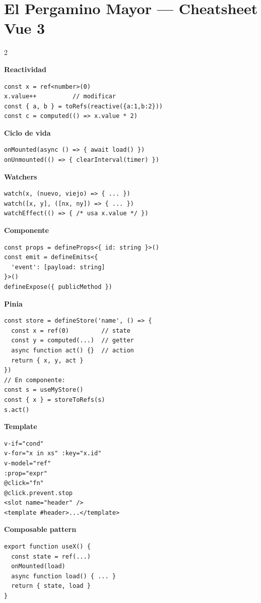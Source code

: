 \documentclass[11pt,a4paper]{article}
\begin{document}
\newpage
\section{El Pergamino Mayor — Cheatsheet Vue 3}

\begin{multicols}{2}

\textbf{\textcolor{vuegreen}{Reactividad}}
\begin{lstlisting}[style=vue,numbers=none]
const x = ref<number>(0)
x.value++          // modificar
const { a, b } = toRefs(reactive({a:1,b:2}))
const c = computed(() => x.value * 2)
\end{lstlisting}

\textbf{\textcolor{vuegreen}{Ciclo de vida}}
\begin{lstlisting}[style=vue,numbers=none]
onMounted(async () => { await load() })
onUnmounted(() => { clearInterval(timer) })
\end{lstlisting}

\textbf{\textcolor{vuegreen}{Watchers}}
\begin{lstlisting}[style=vue,numbers=none]
watch(x, (nuevo, viejo) => { ... })
watch([x, y], ([nx, ny]) => { ... })
watchEffect(() => { /* usa x.value */ })
\end{lstlisting}

\textbf{\textcolor{vuegreen}{Componente}}
\begin{lstlisting}[style=vue,numbers=none]
const props = defineProps<{ id: string }>()
const emit = defineEmits<{
  'event': [payload: string]
}>()
defineExpose({ publicMethod })
\end{lstlisting}

\columnbreak

\textbf{\textcolor{golddnd}{Pinia}}
\begin{lstlisting}[style=vue,numbers=none]
const store = defineStore('name', () => {
  const x = ref(0)         // state
  const y = computed(...)  // getter
  async function act() {}  // action
  return { x, y, act }
})
// En componente:
const s = useMyStore()
const { x } = storeToRefs(s)
s.act()
\end{lstlisting}

\textbf{\textcolor{vuegreen}{Template}}
\begin{lstlisting}[style=vue,numbers=none]
v-if="cond"
v-for="x in xs" :key="x.id"
v-model="ref"
:prop="expr"
@click="fn"
@click.prevent.stop
<slot name="header" />
<template #header>...</template>
\end{lstlisting}

\textbf{\textcolor{purplemage}{Composable pattern}}
\begin{lstlisting}[style=vue,numbers=none]
export function useX() {
  const state = ref(...)
  onMounted(load)
  async function load() { ... }
  return { state, load }
}
\end{lstlisting}

\end{multicols}
\end{document}

